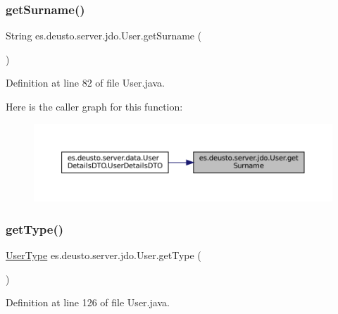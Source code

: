 \subsubsection{\texorpdfstring{getSurname()}{getSurname()}}
{\footnotesize\ttfamily String es.\+deusto.\+server.\+jdo.\+User.\+get\+Surname (\begin{DoxyParamCaption}{ }\end{DoxyParamCaption})}



Definition at line 82 of file User.\+java.

Here is the caller graph for this function\+:
\nopagebreak
\begin{figure}[H]
\begin{center}
\leavevmode
\includegraphics[width=350pt]{classes_1_1deusto_1_1server_1_1jdo_1_1_user_adc7114247c7881e3f9e0fd14b7905f9a_icgraph}
\end{center}
\end{figure}
\mbox{\label{classes_1_1deusto_1_1server_1_1jdo_1_1_user_ac7a47d7d9f3b6212ea22d2fe6b0e8457}} 
\subsubsection{\texorpdfstring{getType()}{getType()}}
{\footnotesize\ttfamily \mbox{\hyperlink{enumes_1_1deusto_1_1server_1_1jdo_1_1_user_type}{User\+Type}} es.\+deusto.\+server.\+jdo.\+User.\+get\+Type (\begin{DoxyParamCaption}{ }\end{DoxyParamCaption})}



Definition at line 126 of file User.\+java.

